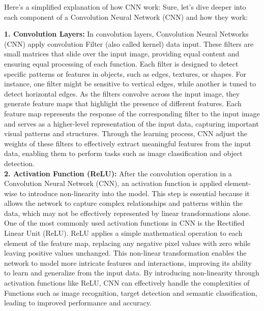 Here's a simplified explanation of how CNN work:
Sure, let's dive deeper into each component of a Convolution Neural Network (CNN) and how they work:

\textbf{1. Convolution Layers:}
In convolution layers, Convolution Neural Networks (CNN) apply convolution Filter (also called kernel) data input. These filters are small matrices that slide over the input image, providing equal content and ensuring equal processing of each function. Each filter is designed to detect specific patterns or features in objects, such as edges, textures, or shapes. For instance, one filter might be sensitive to vertical edges, while another is tuned to detect horizontal edges. As the filters convolve across the input image, they generate feature maps that highlight the presence of different features. Each feature map represents the response of the corresponding filter to the input image and serves as a higher-level representation of the input data, capturing important visual patterns and structures. Through the learning process, CNN adjust the weights of these filters to effectively extract meaningful features from the input data, enabling them to perform tasks such as image classification and object detection.
\\
  

\textbf{2. Activation Function (ReLU):}
After the convolution operation in a Convolution Neural Network (CNN), an activation function is applied element-wise to introduce non-linearity into the model. This step is essential because it allows the network to capture complex relationships and patterns within the data, which may not be effectively represented by linear transformations alone. One of the most commonly used activation functions in CNN is the Rectified Linear Unit (ReLU). ReLU applies a simple mathematical operation to each element of the feature map, replacing any negative pixel values with zero while leaving positive values unchanged. This non-linear transformation enables the network to model more intricate features and interactions, improving its ability to learn and generalize from the input data. By introducing non-linearity through activation functions like ReLU, CNN can effectively handle the complexities of Functions such as image recognition, target detection and semantic classification, leading to improved performance and accuracy.
\\

